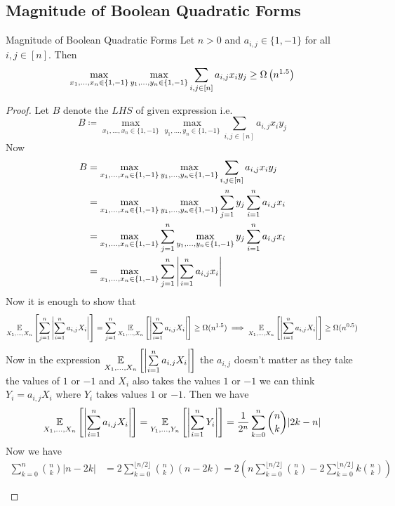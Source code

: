 \subsection{Magnitude of Boolean Quadratic Forms}
\begin{lemma}{Magnitude of Boolean Quadratic Forms}{}
	Let $n>0$ and $a_{i,j}\in\{1,-1\}$ for all $i,j\in[n]$. Then $$\max_{x_1,\dots, x_n\in \{1,-1\}}\max_{y_1,\dots, y_n\in \{1,-1\}}\sum_{i,j\in[n]}a_{i,j}x_iy_j\geq \Omega\left(n^{1.5}\right)$$
\end{lemma}
\begin{proof}
	Let $B$ denote the $LHS$ of given expression i.e. $$B\coloneqq \max_{x_1,\dots, x_n\in \{1,-1\}}\max_{y_1,\dots, y_n\in \{1,-1\}}\sum_{i,j\in[n]}a_{i,j}x_iy_j$$Now\begin{align*}
		B& = \max_{x_1,\dots, x_n\in \{1,-1\}}\max_{y_1,\dots, y_n\in \{1,-1\}}\sum_{i,j\in[n]}a_{i,j}x_iy_j\\
		& = \max_{x_1,\dots, x_n\in \{1,-1\}}\max_{y_1,\dots, y_n\in \{1,-1\}}\sum_{j=1}^ny_j\sum_{i=1}^n a_{i,j}x_i\\
		& =  \max_{x_1,\dots, x_n\in \{1,-1\}}\sum_{j=1}^n\max_{y_1,\dots, y_n\in \{1,-1\}}y_j\sum_{i=1}^n a_{i,j}x_i\\
		& = \max_{x_1,\dots, x_n\in \{1,-1\}}\sum_{j=1}^n\left|\sum_{i=1}^n a_{i,j}x_i\right|\\
	\end{align*}Now it is enough to show that $$\underset{X_1,\dots, X_n}{\mathbb{E}}\left[\sum_{j=1}^n\left|\sum_{i=1}^na_{i,j}X_i\right|\right] =\sum_{j=1}^n\underset{X_1,\dots, X_n}{\mathbb{E}}\left[ \left|\sum_{i=1}^na_{i,j}X_i \right| \right]  \geq \Omega(n^{1.5})\implies \underset{X_1,\dots, X_n}{\mathbb{E}}\left[ \left|\sum\limits_{i=1}^na_{i,j}X_i \right| \right] \geq \Omega(n^{0.5})$$Now in the expression $\underset{X_1,\dots, X_n}{\mathbb{E}}\left[ \left|\sum\limits_{i=1}^na_{i,j}X_i \right| \right] $ the $a_{i,j}$ doesn't matter as they take the values of $1$ or $-1$ and $X_i$ also takes the values $1$ or $-1$ we can think $Y_i=a_{i,j}X_i$ where $Y_i $ takes values $1$ or $-1$. Then we have $$\underset{X_1,\dots, X_n}{\mathbb{E}}\left[ \left|\sum\limits_{i=1}^na_{i,j}X_i \right| \right]=\underset{Y_1,\dots, Y_n}{\mathbb{E}}\left[ \left|\sum\limits_{i=1}^nY_i \right| \right]=\frac1{2^n}\sum_{k=0}^n\binom{n}{k}|2k-n|$$ Now we have 
\begin{align*}
	\sum_{k=0}^n\binom{n}k|n-2k|&=2\sum_{k=0}^{\lfloor n/2\rfloor}\binom{n}k(n-2k)=2\left(n\sum_{k=0}^{\lfloor n/2\rfloor}\binom{n}k-2\sum_{k=0}^{\lfloor n/2\rfloor}k\binom{n}k\right)\\\\

\end{align*}
\end{proof}
